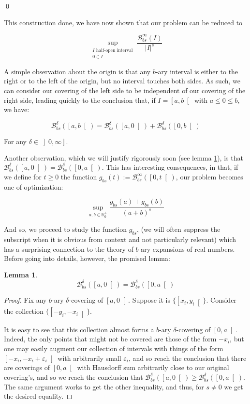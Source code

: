 \documentclass[11pt]{amsart}
\newcommand{\R}{\mathbb{R}}
\newcommand{\BB}{\mathcal{B}}
\newtheorem{lemma}{Lemma}
\begin{document}
\qed

This construction done, we have now shown that our problem can be reduced to


\[\sup_{\substack{\text{$I$ half-open interval}\\ 0 \in I}} \frac{\BB_{bs}^\infty(I)}{\lvert I \rvert^s}\]

A simple observation about the origin is that any $b$-ary interval is either to the right or to the left of the origin, but no interval touches both sides. As such, we can consider our covering of the left side to be independent of our covering of the right side, leading quickly to the conclusion that, if $I = \left[ a, b \right[$ with $a \leq 0 \leq b$, we have:

\[\BB_{bs}^\delta(\left[a, b\right[) = \BB_{bs}^\delta(\left[a, 0\right[) + \BB_{bs}^\delta(\left[0, b\right[)\]

For any $\delta \in \left]0, \infty \right]$.

Another observation, which we will justify rigorously soon (see lemma \ref{sidedoesntmatter}), is that $\BB_{bs}^\delta(\left[a, 0\right[) = \BB_{bs}^\delta(\left[0, a\right[)$. This has interesting consequences, in that, if we define for $t \geq 0$ the function $g_{bs}(t) := \BB_{bs}^\infty(\left[0, t \right[)$, our problem becomes one of optimization:

\[ \sup_{a,b \in \R^+_0} \frac{g_{bs}(a) + g_{bs}(b)}{(a + b)^s} \]

And so, we proceed to study the function $g_{bs}$, (we will often suppress the subscript when it is obvious from context and not particularly relevant) which has a surprising connection to the theory of $b$-ary expansions of real numbers. Before going into details, however, the promised lemma:

\begin{lemma} \label{sidedoesntmatter}
\[\BB_{bs}^\delta(\left[a, 0\right[) = \BB_{bs}^\delta(\left[0, a\right[)\]
\end{lemma}

\begin{proof}
Fix any $b$-ary $\delta$-covering of $\left[a, 0\right[$. Suppose it is $\{\left[x_i, y_i\right[\}$. Consider the collection $\{\left[-y_i, -x_i\right[\}$. 

It is easy to see that this collection almost forms a $b$-ary $\delta$-covering of $\left[0, a\right[$. Indeed, the only points that might not be covered are those of the form $-x_i$, but one may easily augment our collection of intervals with things of the form $\left[ -x_i, -x_i + \varepsilon_i \right[$ with arbitrarily small $\varepsilon_i$, and so reach the conclusion that there are coverings of $\left[0, a\right[$ with Hausdorff sum arbitrarily close to our original covering's, and so we reach the conclusion that $\BB_{bs}^\delta(\left[a, 0\right[) \geq \BB_{bs}^\delta(\left[0, a\right[)$. The same argument works to get the other inequality, and thus, for $s \neq 0$ we get the desired equality.
\end{proof}
\end{document}
